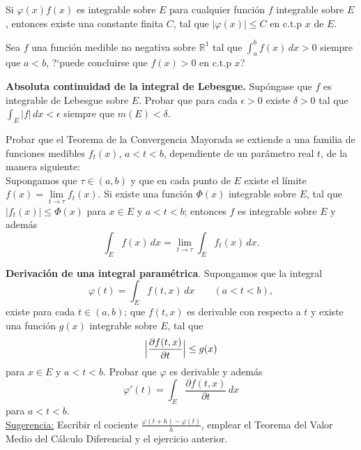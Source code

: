 \documentclass{book}
\newcommand{\rr}{\mathbb{R}}
\begin{document}
  \begin{ejer}{}
	Si $\varphi(x) f(x)$ es integrable sobre $E$ para cualquier función $f$ integrable sobre $E$, entonces
  existe una constante finita $C$, tal que $|\varphi(x)|\leq C$ en c.t.p $x$ de $E$.
	\end{ejer}
  
  \begin{ejer}{} 
	Sea $f$ una función medible no negativa sobre $\rr^1$ tal que $\int_a^b f(x)\,dx>0$ siempre
  que $a<b$, ?`puede concluirse que $f(x)>0$ en c.t.p $x$?
	\end{ejer}
 
	\begin{ejer}{}
	\textbf{Absoluta continuidad de la integral de Lebesgue.}
	Sup\'ongase que $f$ es integrable de Lebesgue sobre $E$. 
	Probar que para cada $\epsilon>0$ existe $\delta>0$ tal que $\int_E |f|\,dx<\epsilon$ siempre que $m(E)<\delta$.
	\end{ejer}
	
  \begin{ejer}{} Probar que el Teorema de la Convergencia Mayorada se extiende a una familia de funciones medibles $f_t(x)$,\;  
  $a<t<b$, dependiente de un parámetro real $t$, de la manera siguiente:
   \\
   Supongamos que $\tau \in (a,b)$ y que en cada punto de $E$ existe el límite 
   $f(x)=\lim\limits_{t \rightarrow \tau} f_t(x)$.
   Si existe una función $\Phi(x)$ integrable sobre $E$, tal que $|f_t(x)|\leq \Phi(x)$ para $x \in E$ y $a<t<b$;
   entonces $f$ es integrable sobre $E$ y además 
   $$\int_E f(x)\,dx=\lim_{t \rightarrow \tau}\int_E f_t(x)\,dx. $$
	\end{ejer}
	
	\begin{ejer}{}
   {\bf{Derivación de una integral paramétrica}}. Supongamos que la integral 
   $$ \varphi(t)=\int_E f(t,x)\,dx\;\;\;\;\;\;\;(a<t<b),$$ 
   existe para cada $t\in (a,b)$; que $f(t,x)$ es derivable con respecto
   a $t$ y existe una función $g(x)$ integrable sobre $E$, tal que 
   $$\Bigl|\frac{\partial f(t,x)}{\partial t}\Bigr|\leq g(x)$$
   para $x \in E$ y $a<t<b$.
   Probar que $\varphi$ es derivable y además 
   $$\varphi'(t)=\int_E \frac{\partial f(t,x)}{\partial t}\,dx $$ para $a<t<b$.
	\\
   \underline{Sugerencia:} Escribir el cociente $\frac{\varphi(t+h)-\varphi(t)}{h}$, emplear el Teorema del Valor
   Medio del Cálculo Diferencial y el ejercicio anterior.
	\end{ejer}
\end{document}
